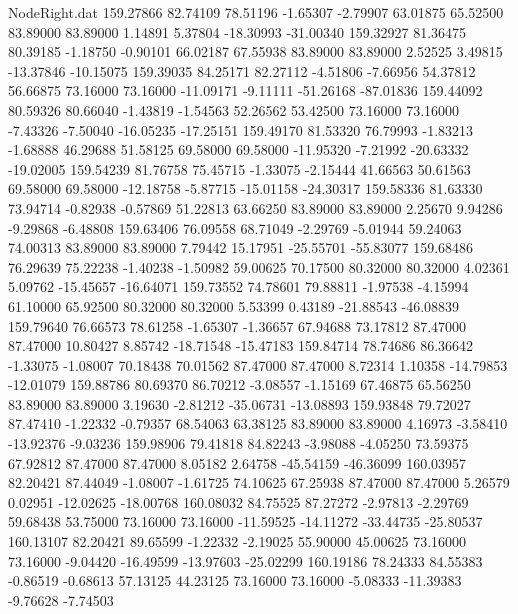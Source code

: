 \begin{filecontents}{NodeRight.dat}
 159.27866   82.74109   78.51196    -1.65307   -2.79907   63.01875   65.52500   83.89000   83.89000    1.14891    5.37804  -18.30993  -31.00340
 159.32927   81.36475   80.39185    -1.18750   -0.90101   66.02187   67.55938   83.89000   83.89000    2.52525    3.49815  -13.37846  -10.15075
 159.39035   84.25171   82.27112    -4.51806   -7.66956   54.37812   56.66875   73.16000   73.16000  -11.09171   -9.11111  -51.26168  -87.01836
 159.44092   80.59326   80.66040    -1.43819   -1.54563   52.26562   53.42500   73.16000   73.16000   -7.43326   -7.50040  -16.05235  -17.25151
 159.49170   81.53320   76.79993    -1.83213   -1.68888   46.29688   51.58125   69.58000   69.58000  -11.95320   -7.21992  -20.63332  -19.02005
 159.54239   81.76758   75.45715    -1.33075   -2.15444   41.66563   50.61563   69.58000   69.58000  -12.18758   -5.87715  -15.01158  -24.30317
 159.58336   81.63330   73.94714    -0.82938   -0.57869   51.22813   63.66250   83.89000   83.89000    2.25670    9.94286   -9.29868   -6.48808
 159.63406   76.09558   68.71049    -2.29769   -5.01944   59.24063   74.00313   83.89000   83.89000    7.79442   15.17951  -25.55701  -55.83077
 159.68486   76.29639   75.22238    -1.40238   -1.50982   59.00625   70.17500   80.32000   80.32000    4.02361    5.09762  -15.45657  -16.64071
 159.73552   74.78601   79.88811    -1.97538   -4.15994   61.10000   65.92500   80.32000   80.32000    5.53399    0.43189  -21.88543  -46.08839
 159.79640   76.66573   78.61258    -1.65307   -1.36657   67.94688   73.17812   87.47000   87.47000   10.80427    8.85742  -18.71548  -15.47183
 159.84714   78.74686   86.36642    -1.33075   -1.08007   70.18438   70.01562   87.47000   87.47000    8.72314    1.10358  -14.79853  -12.01079
 159.88786   80.69370   86.70212    -3.08557   -1.15169   67.46875   65.56250   83.89000   83.89000    3.19630   -2.81212  -35.06731  -13.08893
 159.93848   79.72027   87.47410    -1.22332   -0.79357   68.54063   63.38125   83.89000   83.89000    4.16973   -3.58410  -13.92376   -9.03236
 159.98906   79.41818   84.82243    -3.98088   -4.05250   73.59375   67.92812   87.47000   87.47000    8.05182    2.64758  -45.54159  -46.36099
 160.03957   82.20421   87.44049    -1.08007   -1.61725   74.10625   67.25938   87.47000   87.47000    5.26579    0.02951  -12.02625  -18.00768
 160.08032   84.75525   87.27272    -2.97813   -2.29769   59.68438   53.75000   73.16000   73.16000  -11.59525  -14.11272  -33.44735  -25.80537
 160.13107   82.20421   89.65599    -1.22332   -2.19025   55.90000   45.00625   73.16000   73.16000   -9.04420  -16.49599  -13.97603  -25.02299
 160.19186   78.24333   84.55383    -0.86519   -0.68613   57.13125   44.23125   73.16000   73.16000   -5.08333  -11.39383   -9.76628   -7.74503

\end{filecontents}
